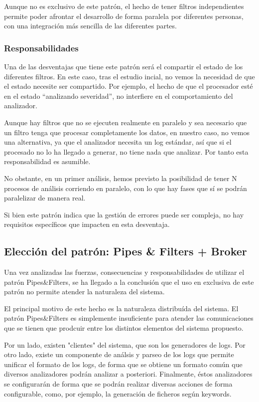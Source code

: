 \documentclass[11pt]{article}
\begin{document}
Aunque no es exclusivo de este patrón, el hecho de tener filtros independientes permite poder afrontar el desarrollo de forma paralela por diferentes personas, con una integración más sencilla de las diferentes partes.

\subsubsection{Responsabilidades}

Una de las desventajas que tiene este patrón será el compartir el estado de los diferentes filtros. En este caso, tras el estudio incial, no vemos la necesidad de que el estado necesite ser compartido. Por ejemplo, el hecho de que el procesador esté en el estado “analizando severidad”, no interfiere en el comportamiento del analizador.

Aunque hay filtros que no se ejecuten realmente en paralelo y sea necesario que un filtro tenga que procesar completamente los datos, en nuestro caso, no vemos una alternativa, ya que el analizador necesita un log estándar, así que si el procesado no lo ha llegado a generar, no tiene nada que analizar. Por tanto esta responsabilidad es asumible.

No obstante, en un primer análisis, hemos previsto la posibilidad de tener N procesos de análisis corriendo en paralelo, con lo que hay fases que sí se podrán paralelizar de manera real.

Si bien este patrón indica que la gestión de errores puede ser compleja, no hay requisitos específicos que impacten en esta desventaja.

\subsection{Elección del patrón: Pipes \& Filters + Broker}

Una vez analizadas las fuerzas, consecuencias y responsabilidades de utilizar el patrón Pipes\&Filters, se ha llegado a la conclusión que el uso en exclusiva de este patrón no permite atender la naturaleza del sistema.

El principal motivo de este hecho es la naturaleza distribuída del sistema. El patrón Pipes\&Filters es simplemente insuficiente para atender las comunicaciones que se tienen que prodcuir entre los distintos elementos del sistema propuesto.

Por un lado, existen "clientes" del sistema, que son los generadores de logs. Por otro lado, existe un componente de análsis y parseo de los logs que permite unificar el formato de los logs, de forma que se obtiene un formato común que diversos analizadores podrán analizar a posteriori. Finalmente, éstos analizadores se configurarán de forma que se podrán realizar diversas acciones de forma configurable, como, por ejemplo, la generación de ficheros según keywords.
\end{document}
